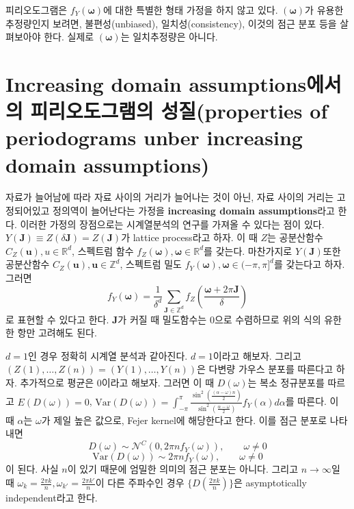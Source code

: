 \documentclass[b5paper,]{scrbook}
\theoremstyle{plain}
\theoremstyle{definition}
\numberwithin{equation}{section}
\begin{document}
피리오도그램은 \(f_{Y}(\boldsymbol{\omega})\)에 대한 특별한 형태 가정을 하지 않고 있다. \((\boldsymbol{\omega})\)가 유용한 추정량인지 보려면, 불편성(unbiased), 일치성(consistency), 이것의 점근 분포 등을 살펴보아야 한다. 실제로 \((\boldsymbol{\omega})\)는 일치추정량은 아니다.

\hypertarget{increasing-domain-assumptions--properties-of-periodograms-unber-increasing-domain-assumptions}{%
\section{Increasing domain assumptions에서의 피리오도그램의 성질(properties of periodograms unber increasing domain assumptions)}\label{increasing-domain-assumptions--properties-of-periodograms-unber-increasing-domain-assumptions}}

자료가 늘어남에 따라 자료 사이의 거리가 늘어나는 것이 아닌, 자료 사이의 거리는 고정되어있고 정의역이 늘어난다는 가정을 \textbf{increasing domain assumptions}라고 한다. 이러한 가정의 장점으로는 시계열분석의 연구를 가져올 수 있다는 점이 있다. \(Y(\mathbf{J})\equiv Z(\delta \mathbf{J})=Z(\mathbf{J})\)가 lattice process라고 하자. 이 때 \(Z\)는 공분산함수 \(C_{Z}(\mathbf{u}), u\in \mathbb{R}^{d}\), 스펙트럼 함수 \(f_{Z}(\boldsymbol{\omega}), \boldsymbol{\omega}\in\mathbb{R}^{d}\)를 갖는다. 마찬가지로 \(Y(\mathbf{J})\)또한 공분산함수 \(C_{Z}(\mathbf{u}), \mathbf{u}\in\mathbb{Z}^{d}\), 스펙트럼 밀도 \(f_{Y}(\boldsymbol{\omega}), \boldsymbol{\omega}\in (-\pi,\pi]^{d}\)를 갖는다고 하자. 그러면
\[f_{Y}(\boldsymbol{\omega}) = \frac{1}{\delta^{d}}\sum_{\mathbf{J}\in \mathbb{Z}^{d}}f_{Z}(\frac{\boldsymbol{\omega}+2\pi \mathbf{J}}{\delta})\]
로 표현할 수 있다고 한다. \(\mathbf{J}\)가 커질 때 밀도함수는 0으로 수렴하므로 위의 식의 유한한 항만 고려해도 된다.

\(d=1\)인 경우 정확히 시계열 분석과 같아진다. \(d=1\)이라고 해보자. 그리고 \((Z(1),\ldots , Z(n))=(Y(1),\ldots , Y(n))\)은 다변량 가우스 분포를 따른다고 하자. 추가적으로 평균은 0이라고 해보자. 그러면 이 때 \(D(\omega)\)는 복소 정규분포를 따르고 \(E(D(\omega))=0\), \(\text{Var}(D(\omega))=\int_{-\pi}^{\pi}\frac{\sin^{2}(\frac{(\alpha-\omega)n}{2})}{\sin^{2}(\frac{\alpha-\omega}{2})}f_{Y}(\alpha)d\alpha\)를 따른다. 이 때 \(\alpha\)는 \(\omega\)가 제일 높은 값으로, Fejer kernel에 해당한다고 한다. 이를 점근 분포로 나타내면
\[D(\omega) \sim \mathcal{N}^{C}(0,2\pi n f_{Y}(\omega)), \qquad{\omega\neq 0}\]
\[\text{Var}(D(\omega))\sim 2\pi n f_{Y}(\omega), \qquad{\omega\neq 0}\]
이 된다. 사실 \(n\)이 있기 때문에 엄밀한 의미의 점근 분포는 아니다. 그리고 \(n\rightarrow \infty\)일 때 \(\omega_{k}=\frac{2\pi k}{n}, \omega_{k'}=\frac{2\pi k'}{n}\)이 다른 주파수인 경우 \(\{ D(\frac{2\pi k}{n})\}\)은 asymptotically independent라고 한다.
\end{document}
